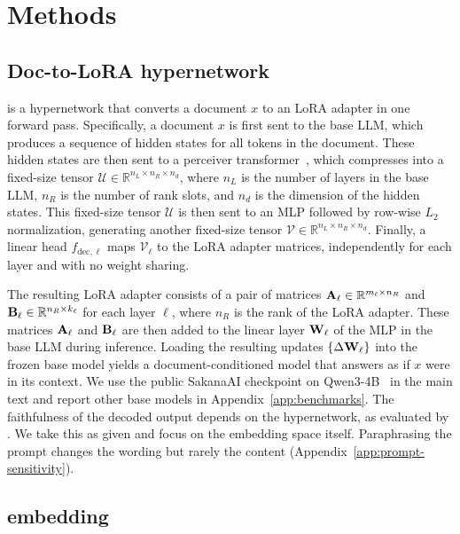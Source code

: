 \section{Methods}
\label{sec:method}

\subsection{Doc-to-LoRA hypernetwork}
\label{sec:doc2lora}

\doctolora is a hypernetwork that converts a document $x$ to an LoRA adapter in one forward pass.
Specifically, a document $x$ is first sent to the base LLM, which produces a sequence of hidden states for all tokens in the document.  
These hidden states are then sent to a perceiver transformer~\citep{jaegle2021perceiver}, which compresses into a fixed-size tensor $\mathcal{U} \in \mathbb{R}^{n_L \times n_R \times n_d}$, where $n_L$ is the number of layers in the base LLM, $n_R$ is the number of rank slots, and $n_d$ is the dimension of the hidden states.
This fixed-size tensor $\mathcal{U}$ is then sent to an MLP followed by row-wise $L_2$ normalization, generating another fixed-size tensor $\mathcal{V} \in \mathbb{R}^{n_L \times n_R \times n_d}$.
Finally, a linear head $f_{\mathrm{dec},\ell}$ maps $\mathcal{V}_{\ell}$ to the LoRA adapter matrices, independently for each layer and with no weight sharing.

The resulting LoRA adapter consists of a pair of matrices ${\mathbf{A}}_{\ell} \in \mathbb{R}^{m_\ell \times n_R}$ and ${\mathbf{B}}_{\ell} \in \mathbb{R}^{n_R \times k_\ell}$ for each layer $\ell$, where $n_R$ is the rank of the LoRA adapter. 
These matrices ${\mathbf{A}}_{\ell}$ and ${\mathbf{B}}_{\ell}$ are then added to the linear layer ${\mathbf{W}}_{\ell}$ of the MLP in the base LLM during inference.
Loading the resulting updates $\{\Delta{\mathbf{W}}_{\ell}\}$ into the frozen base model yields a document-conditioned model that answers as if $x$ were in its context. We use the public SakanaAI checkpoint on Qwen3-4B~\citep{qwen3-2025} in the main text and report other base models in Appendix~\ref{app:benchmarks}.
The faithfulness of the decoded output depends on the hypernetwork, as evaluated by \citet{sakana2024doc2lora}.
We take this as given and focus on the embedding space itself. 
Paraphrasing the prompt changes the wording but rarely the content (Appendix~\ref{app:prompt-sensitivity}).

\subsection{\doctolora embedding}
\label{sec:doc2lora-embedding}

